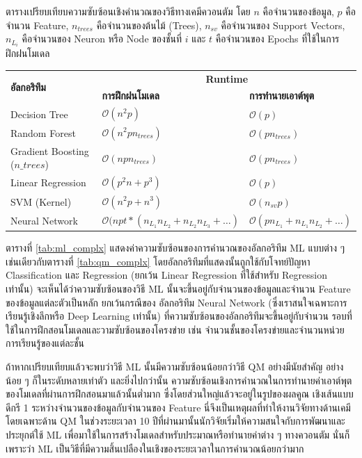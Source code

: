 \begin{adjustwidth}{-2.5 cm}{-2.5 cm}
    \centering
    \begin{threeparttable}[htbp]
    \caption{ตารางเปรียบเทียบความซับซ้อนเชิงคำนวณของวิธีทางเคมีควอนตัม\autocite{zotero-328} โดย $n$ คือจำนวนของข้อมูล, $p$ 
    คือจำนวน Feature, $n_{trees}$ คือจำนวนของต้นไม้ (Trees), $n_{sv}$ คือจำนวนของ Support Vectors, $n_{L_{i}}$ 
    คือจำนวนของ Neuron หรือ Node ของชั้นที่ $i$ และ $t$ คือจำนวนของ Epochs ที่ใช้ในการฝึกฝนโมเดล}
    \label{tab:ml_complx}
    \small
    \begin{tabular}{lll}\toprule
    \multirow{2}{*}{\textbf{อัลกอริทึม}} &\multicolumn{2}{c}{\textbf{Runtime}} \\\cmidrule{2-3}
    &\textbf{การฝึกฝนโมเดล} &\textbf{การทำนายเอาต์พุต}\\\midrule
    Decision Tree &$\mathcal{O}(n^{2}p)$ &$\mathcal{O}(p)$ \\
    Random Forest &$\mathcal{O}(n^{2}pn_{trees})$ &$\mathcal{O}(pn_{trees})$ \\
    Gradient Boosting ($n\_{trees}$) &$\mathcal{O}(npn_{trees})$ &$\mathcal{O}(pn_{trees})$ \\
    Linear Regression &$\mathcal{O}(p^{2}n+p^{3})$ &$\mathcal{O}(p)$ \\
    SVM (Kernel) &$\mathcal{O}(n^{2}p+n^{3})$ &$\mathcal{O}(n_{sv}p)$ \\
    Neural Network &$\mathcal{O}(npt*(n_{L_{1}}n_{L_{2}}+ n_{L_{2}}n_{L_{3}} + \dots)$ &$\mathcal{O}(pn_{L_{1}} 
    + n_{L_{1}}n_{L_{2}}+ \dots)$ \\
    \bottomrule
    \end{tabular}
\end{threeparttable}
\end{adjustwidth}

ตารางที่ \ref{tab:ml_complx} แสดงค่าความซับซ้อนของการคำนวณของอัลกอริทึม ML แบบต่าง ๆ เช่นเดียวกับตารางที่ \ref{tab:qm_complx} 
โดยอัลกอริทึมที่แสดงนั้นถูกใช้กับโจทย์ปัญหา Classification และ Regression (ยกเว้น Linear Regression ที่ใช้สำหรับ Regression 
เท่านั้น) จะเห็นได้ว่าความซับซ้อนของวิธี ML นั้นจะขึ้นอยู่กับจำนวนของข้อมูลและจำนวน Feature ของข้อมูลแต่ละตัวเป็นหลัก ยกเว้นกรณีของ%
อัลกอริทึม Neural Network (ซึ่งเราสนใจเฉพาะการเรียนรู้เชิงลึกหรือ Deep Learning เท่านั้น) ที่ความซับซ้อนของอัลกอริทึมจะขึ้นอยู่กับจำนวน%
รอบที่ใช้ในการฝึกสอนโมเดลและวามซับซ้อนของโครงข่าย เช่น จำนวนชั้นของโครงข่ายและจำนวนหน่วยการเรียนรู้ของแต่ละชั้น

ถ้าหากเปรียบเทียบแล้วจะพบว่าวิธี ML นั้นมีความซับซ้อนน้อยกว่าวิธี QM อย่างมีนัยสำคัญ อย่างน้อย ๆ ก็ในระดับหลายเท่าตัว และยิ่งไปกว่านั้น
ความซับซ้อนเชิงการคำนวณในการทำนายค่าเอาต์พุตของโมเดลที่ผ่านการฝึกสอนมาแล้วนั้นต่ำมาก ซึ่งโดยส่วนใหญ่แล้วจะอยู่ในรูปของผลคูณ%
เชิงเส้นแบบดีกรี 1 ระหว่างจำนวนของข้อมูลกับจำนวนของ Feature นี่จึงเป็นเหตุผลที่ทำให้งานวิจัยทางด้านเคมีโดยเฉพาะด้าน QM ในช่วงระยะเวลา
10 ปีที่ผ่านมานั้นนักวิจัยเริ่มให้ความสนใจกับการพัฒนาและประยุกต์ใช้ ML เพื่อมาใช้ในการสร้างโมเดลสำหรับประมาณหรือทำนายค่าต่าง ๆ ทางควอนตัม%
นั่นก็เพราะว่า ML เป็นวิธีที่มีความสิ้นเปลืองในเชิงของระยะเวลาในการคำนวณน้อยกว่ามาก

